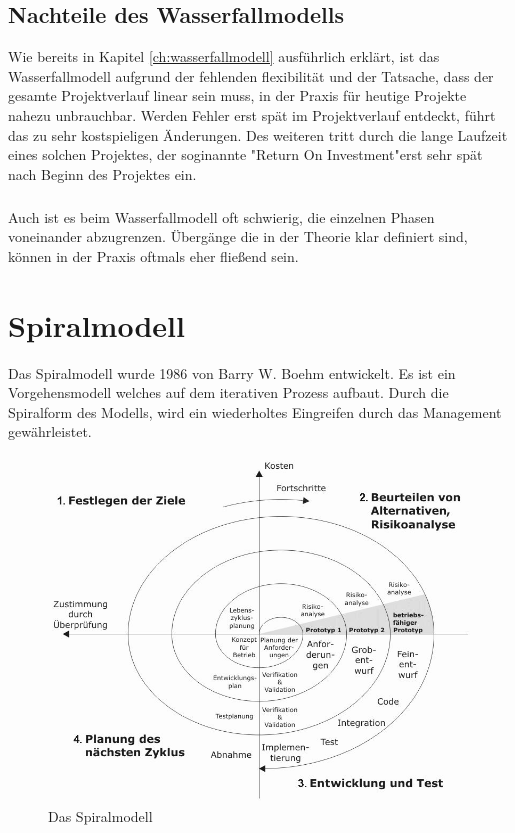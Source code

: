 \documentclass[a4paper, twopage]{scrreprt}
\begin{document}
\section{Nachteile des Wasserfallmodells}
\label{sec:wasserfallmodell_nachteile}
Wie bereits in Kapitel \ref{ch:wasserfallmodell} ausführlich erklärt, ist das Wasserfallmodell aufgrund der fehlenden flexibilität und der Tatsache, dass der gesamte Projektverlauf linear sein muss, in der Praxis für heutige Projekte nahezu unbrauchbar. Werden Fehler erst spät im Projektverlauf entdeckt, führt das zu sehr kostspieligen Änderungen. Des weiteren tritt durch die lange Laufzeit eines solchen Projektes, der soginannte "Return On Investment"\footnotemark erst sehr spät nach Beginn des Projektes ein.
\paragraph*{}
Auch ist es beim Wasserfallmodell oft schwierig, die einzelnen Phasen voneinander abzugrenzen. Übergänge die in der Theorie klar definiert sind, können in der Praxis oftmals eher fließend sein.

\chapter{Spiralmodell}
\label{ch:spiralmodell}
Das Spiralmodell wurde 1986 von Barry W. Boehm entwickelt. Es ist ein Vorgehensmodell welches auf dem iterativen Prozess aufbaut. Durch die Spiralform des Modells, wird ein wiederholtes Eingreifen durch das Management gewährleistet.
\begin{figure}[h]
\centering
	\includegraphics[scale=0.6]{Images/spiralmodell}
	\caption{Das Spiralmodell\cite{wikipedia:spiralmodell}}
	\label{fig:spiralmodell}
\end{figure}
\end{document}
